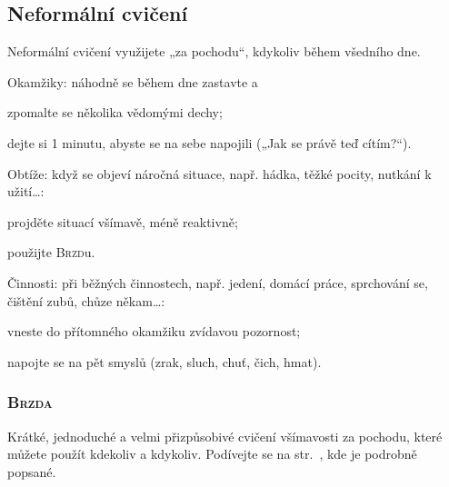 	\subsection{Neformální cvičení}
		Neformální cvičení využijete „za pochodu“, kdykoliv během všedního dne.
		\begin{description*}
			\item[Okamžiky:] náhodně se během dne zastavte a
				\begin{itemize*}
					\item zpomalte se několika vědomými dechy;
					\item dejte si 1 minutu, abyste se na sebe napojili („Jak se právě teď cítím?“).
				\end{itemize*}
			\item[Obtíže:] když se objeví náročná situace, např. hádka, těžké pocity, nutkání k užití…:
				\begin{itemize*}
					\item projděte situací všímavě, méně reaktivně;
					\item použijte \textsc{Brzd}u.
				\end{itemize*}
			\item[Činnosti:] při běžných činnostech, např. jedení, domácí práce, sprchování se, čištění zubů, chůze někam…:
				\begin{itemize*}
					\item vneste do přítomného okamžiku zvídavou pozornost;
					\item napojte se na pět smyslů (zrak, sluch, chuť, čich, hmat).
				\end{itemize*}
		\end{description*}
	\subsubsection*{\textsc{Brzda}}
		Krátké, jednoduché a velmi přizpůsobivé cvičení všímavosti za pochodu, které můžete použít kdekoliv a kdykoliv. Podívejte se na str.~\pageref{sober}, kde je podrobně popsané.
